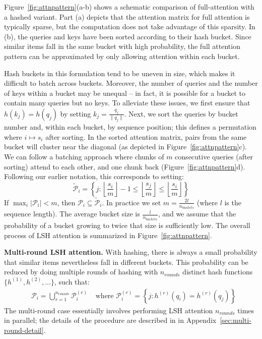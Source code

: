 \documentclass{article} \usepackage{iclr2020_conference,times}
\renewcommand{\paragraph}[1]{\textbf{#1}}
\def\pair{\mathcal{P}}
\def\extpair{\widetilde{\mathcal{P}}}
\begin{document}
Figure~\ref{fig:attnpattern}(a-b) shows a schematic comparison of full-attention with a hashed variant. Part (a) depicts that the attention matrix for full attention is typically sparse, but the computation does not take advantage of this sparsity. In (b), the queries and keys have been sorted according to their hash bucket. Since similar items fall in the same bucket with high probability, the full attention pattern can be approximated by only allowing attention within each bucket.

Hash buckets in this formulation tend to be uneven in size, which makes it difficult to batch across buckets. Moreover, the number of queries and the number of keys within a bucket may be unequal -- in fact, it is possible for a bucket to contain many queries but no keys. To alleviate these issues, we first ensure that $h(k_j) = h(q_j)$ by setting $k_j = \frac{q_j}{\|q_j\|}$. Next, we sort the queries by bucket number and, within each bucket, by sequence position; this defines a permutation where $i \mapsto s_i$ after sorting. In the sorted attention matrix, pairs from the same bucket will cluster near the diagonal (as depicted in Figure~\ref{fig:attnpattern}c). We can follow a batching approach where chunks of $m$ consecutive queries (after sorting) attend to each other, and one chunk back (Figure~\ref{fig:attnpattern}d). Following our earlier notation, this corresponds to setting:
\begin{equation}
    \extpair_i = \left\{ j : \left\lfloor \frac{s_i}{m}\right\rfloor - 1 \leq \left\lfloor \frac{s_j}{m}\right\rfloor \leq  \left\lfloor \frac{s_i}{m}\right\rfloor \right\}
\end{equation}
If $\max_i \left|\pair_i\right| < m$, then $\pair_i \subseteq \extpair_i$. In practice we set $m = \frac{2l}{n_{buckets}}$ (where $l$ is the sequence length). The average bucket size is $\frac{l}{n_{buckets}}$, and we assume that the probability of a bucket growing to twice that size is sufficiently low.
The overall process of LSH attention is summarized in Figure~\ref{fig:attnpattern}.

\paragraph{Multi-round LSH attention.}
With hashing, there is always a small probability that similar items nevertheless fall in different buckets. This probability can be reduced by doing multiple rounds of hashing with $n_{rounds}$ distinct hash functions $\{h^{(1)}, h^{(2)}, \ldots\}$, such that:
\begin{align}\label{eq:union-pairs}
    &\pair_i = \bigcup_{r=1}^{n_{rounds}} \pair^{(r)}_i
    & \text{ where } \pair^{(r)}_i = \left\{ j : h^{(r)}(q_i) = h^{(r)}(q_j) \right\}
\end{align}
The multi-round case essentially involves performing LSH attention $n_{rounds}$ times in parallel; the details of the procedure are described in in Appendix~\ref{sec:multi-round-detail}.
\end{document}
